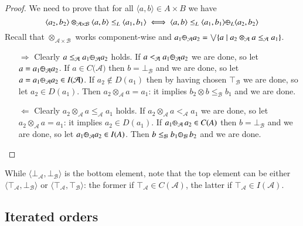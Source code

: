 \documentclass[a4paper]{elsarticle}
\newcommand{\1}{\mathbf{1}}
\def\odiv{{ \ominus\hspace{-8pt}:}\;}
\begin{document}
\begin{proof}
We need to prove that for all $\langle a, b\rangle \in A\times B$ we have
$$\langle a_2, b_2\rangle \otimes_{\mathcal{A} \times \mathcal{B}} \langle a, b\rangle \leq_L \langle a_1, b_1\rangle
\iff \langle a, b\rangle \leq_L  \langle a_1, b_1\rangle \odiv_L \langle a_2, b_2\rangle$$
%
Recall that $\otimes_{\mathcal{A} \times \mathcal{B}}$ works component-wise and 
$a_1 \odiv_\mathcal{A} a_2 = \bigvee \{a \mid a_2 \otimes_\mathcal{A} a \leq_\mathcal{A} a_1\}$.

\begin{itemize}
\item[$\Rightarrow$] Clearly $a \leq_\mathcal{A} a_1 \odiv_\mathcal{A} a_2$ holds.
If $a <_\mathcal{A} a_1 \odiv_\mathcal{A} a_2$ we are done, so let 
$a = a_1 \odiv_\mathcal{A} a_2$. If $a \in C(\mathcal{A)}$ then 
$b = \bot_\mathcal{B}$ and we are done, so let $a = a_1 \odiv_\mathcal{A} a_2 \in I(\mathcal{A)}$.
If $a_2 \not \in D(a_1)$ then by having chosen $\top_\mathcal{B}$ we are done, so let $a_2 \in D(a_1)$.
Then $a_2 \otimes_\mathcal{A} a = a_1$: it implies $b_2 \otimes b \leq_\mathcal{B} b_1$
and we are done.

\item[$\Leftarrow$]
Clearly $a_2 \otimes_\mathcal{A} a \leq_\mathcal{A} a_1$ holds.
If $a_2 \otimes_\mathcal{A} a <_\mathcal{A} a_1$ we are done, so let 
$a_2 \otimes_\mathcal{A} a = a_1$: it implies $a_2 \in D(a_1)$.
If $a_1 \odiv_\mathcal{A} \, a_2 \in C(A)$ then $b = \bot_\mathcal{B}$ and we are done, so let
$a_1 \odiv_\mathcal{A} a_2 \in I(A)$. Then $b\leq_\mathcal{B} b_1 \odiv_\mathcal{B} \, b_2$
and we are done.
\end{itemize}
%
\end{proof}

While $\langle \bot_\mathcal{A}, \bot_\mathcal{B} \rangle$ is the bottom element, note that the top element can be 
either $\langle \top_\mathcal{A}, \bot_\mathcal{B} \rangle$ or $\langle \top_\mathcal{A}, \top_\mathcal{B} \rangle$:
the former if $\top_\mathcal{A} \in C(\mathcal{A})$, the latter if $\top_\mathcal{A} \in I(\mathcal{A})$.

\subsection{Iterated orders}
\end{document}
